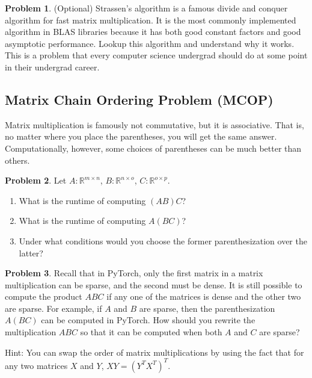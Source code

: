 \documentclass[10pt]{article}
\theoremstyle{definition}
\newtheorem{problem}{Problem}
\newcommand{\R}{\mathbb R}
\newcommand{\trans}[1]{{#1}^{T}}
\begin{document}
\newpage
\begin{problem}
    (Optional)
    Strassen's algorithm is a famous divide and conquer algorithm for fast matrix multiplication.
    It is the most commonly implemented algorithm in BLAS libraries because it has both good constant factors and good asymptotic performance.
    Lookup this algorithm and understand why it works.
    This is a problem that every computer science undergrad should do at some point in their undergrad career.
\end{problem}



\subsection{Matrix Chain Ordering Problem (MCOP)}

Matrix multiplication is famously not commutative, but it is associative.
That is, no matter where you place the parentheses,
you will get the same answer.
Computationally, however, some choices of parentheses can be much better than others.

\begin{problem}
    Let $A : \R^{m\times n}$, $B : \R^{n\times o}$, $C : \R^{o\times p}$.

    \begin{enumerate}
        \item What is the runtime of computing $(AB)C$?
            \vspace{2in}
        \item What is the runtime of computing $A(BC)$?
            \vspace{2in}
        \item Under what conditions would you choose the former parenthesization over the latter?
            \vspace{2in}
    \end{enumerate}
\end{problem}

\newpage
\begin{problem}
Recall that in PyTorch, only the first matrix in a matrix multiplication can be sparse,
and the second must be dense.
It is still possible to compute the product $ABC$ if any one of the matrices is dense and the other two are sparse.
For example, if $A$ and $B$ are sparse, then the parenthesization $A(BC)$ can be computed in PyTorch.
How should you rewrite the multiplication $ABC$ so that it can be computed when both $A$ and $C$ are sparse?

    \vspace{0.1in}
\noindent
Hint: You can swap the order of matrix multiplications by using the fact that for any two matrices $X$ and $Y$, $XY = \trans{(\trans Y \trans X)}$.
\end{problem}
\end{document}
